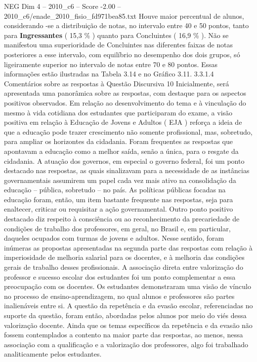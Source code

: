 \begin{textsample}{NEG Dim 4 – 2010\_c6 – Score -2.00 – 2010\_c6/enade\_2010\_fisio\_fd971bea85.txt}
Houve maior percentual de alunos, considerando -se a distribuição de notas, no intervalo entre 40 e 50 pontos, tanto para \textbf{Ingressantes} ( 15,3 \% ) quanto para Concluintes ( 16,9 \% ).
Não se manifestou uma superioridade de Concluintes nas diferentes faixas de notas posteriores a esse intervalo, com equilíbrio no desempenho dos dois grupos, só ligeiramente superior no intervalo de notas entre 70 e 80 pontos.
Essas informações estão ilustradas na Tabela 3.14 e no Gráfico 3.11. 3.3.1.4 Comentários sobre as respostas à Questão Discursiva 10 Inicialmente, será apresentada uma panorâmica sobre as respostas, com destaque para os aspectos positivos observados.
Em relação ao desenvolvimento do tema e à vinculação do mesmo à vida cotidiana dos estudantes que participaram do exame, a visão positiva em relação à Educação de Jovens e Adultos ( EJA ) reforça a ideia de que a educação pode trazer crescimento não somente profissional, mas, sobretudo, para ampliar os horizontes da cidadania.
Foram frequentes as respostas que apontavam a educação como a melhor saída, senão a única, para o resgate da cidadania.
A atuação dos governos, em especial o governo federal, foi um ponto destacado nas respostas, as quais sinalizavam para a necessidade de as instâncias governamentais assumirem um papel cada vez mais ativo na consolidação da educação – pública, sobretudo – no país.
As políticas públicas focadas na educação foram, então, um item bastante frequente nas respostas, seja para enaltecer, criticar ou requisitar a ação governamental.
Outro ponto positivo destacado diz respeito à consciência ou ao reconhecimento da precariedade de condições de trabalho dos professores, em geral, no Brasil e, em particular, daqueles ocupados com turmas de jovens e adultos.
Nesse sentido, foram inúmeras as propostas apresentadas na segunda parte das respostas com relação à imperiosidade de melhoria salarial para os docentes, e à melhoria das condições gerais de trabalho desses profissionais.
A associação direta entre valorização do professor e sucesso escolar dos estudantes foi um ponto complementar a essa preocupação com os docentes.
Os estudantes demonstraram uma visão de vínculo no processo de ensino-aprendizagem, no qual alunos e professores são partes inalienáveis entre si.
A questão da repetência e da evasão escolar, referenciadas no suporte da questão, foram então, abordadas pelos alunos por meio do viés dessa valorização docente.
Ainda que os temas específicos da repetência e da evasão não fossem contemplados a contento na maior parte das respostas, ao menos, nessa associação com a qualificação e a valorização dos professores, algo foi trabalhado analiticamente pelos estudantes.

\end{textsample}
